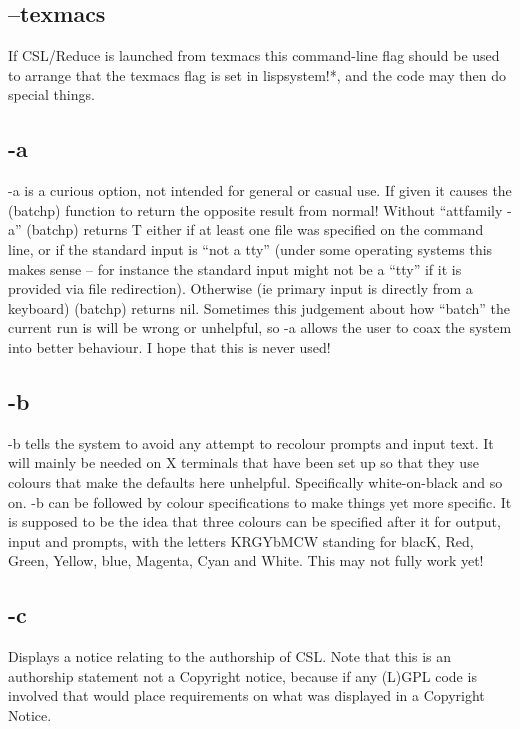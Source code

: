 \documentclass[a4paper,11pt]{article}
\begin{document}
\subsection{\ttfamily --texmacs}
   If CSL/Reduce is launched from texmacs this command-line flag should be
   used to arrange that the {\ttfamily texmacs} flag is set in
   {\ttfamily lispsystem!*}, and the code may then do special things.

\subsection{\ttfamily -a}
   {\ttfamily -a} is a curious option, not intended for general or casual use.
   If given it causes the {\ttfamily (batchp)} function to return the opposite
   result from normal!  Without ``{attfamily -a}'' {\ttfamily (batchp)} returns
   {\ttfamily T} either if at least one file was specified on the command line,
   or if the standard input is ``not a tty'' (under some operating systems this
   makes sense -- for instance the standard input might not be a ``tty'' if it
   is provided via file redirection).  Otherwise (ie primary input is directly
   from a keyboard) {\ttfamily (batchp)} returns {\ttfamily nil}.  Sometimes
   this judgement about how ``batch'' the current run is will be wrong or
   unhelpful, so {\ttfamily -a} allows the user to coax the system into better
   behaviour.  I hope that this is never used!

\subsection{\ttfamily -b}
   {\ttfamily -b} tells the system to avoid any attempt to recolour prompts
   and input text. It will mainly be needed on X terminals that have been
   set up so that they use colours that make the defaults here unhelpful.
   Specifically white-on-black and so on.
   {\ttfamily -b} can be followed by colour specifications to make things yet
   more specific. It is supposed to be the idea that three colours can be
   specified after it for output, input and prompts, with the letters KRGYbMCW
   standing for blacK, Red, Green, Yellow, blue, Magenta, Cyan and White.
   This may not fully work yet!

\subsection{\ttfamily -c}
   Displays a notice relating to the authorship of CSL. Note that this
   is an authorship statement not a Copyright notice, because if any
   (L)GPL code is involved that would place requirements on what was
   displayed in a Copyright Notice.
\end{document}
